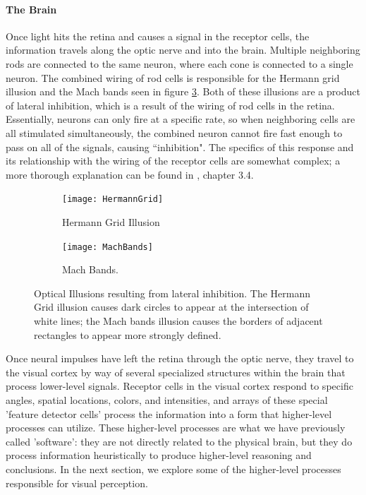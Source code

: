 \documentclass[11pt]{isuthesis}\usepackage[]{graphicx}\usepackage[]{color}
\begin{document}
\paragraph{The Brain}
Once light hits the retina and causes a signal in the receptor cells, the information travels along the optic nerve and into the brain. Multiple neighboring rods are connected to the same neuron, where each cone is connected to a single neuron. The combined wiring of rod cells is responsible for the Hermann grid illusion and the Mach bands seen in figure \ref{fig:InhibitionIllusions}. Both of these illusions are a product of lateral inhibition, which is a result of the wiring of rod cells in the retina. Essentially, neurons can only fire at a specific rate, so when neighboring cells are all stimulated simultaneously, the combined neuron cannot fire fast enough to pass on all of the signals, causing ``inhibition". The specifics of this response and its relationship with the wiring of the receptor cells are somewhat complex; a more thorough explanation can be found in \citet{goldstein}, chapter 3.4. 

\begin{figure}
\centering
\begin{subfigure}[b]{.45\linewidth}
  \centering
  \texttt{[image: HermannGrid]}
  \caption{\small Hermann Grid Illusion \label{fig:hermanngrid}}
\end{subfigure}\hfill
\begin{subfigure}[b]{.45\linewidth}
  \centering
  \texttt{[image: MachBands]}
  \caption{\small Mach Bands. 
  \label{fig:machbands}}
\end{subfigure}
\caption[Inhibition Illusions]{Optical Illusions resulting from lateral inhibition. The Hermann Grid illusion causes dark circles to appear at the intersection of white lines; the Mach bands illusion causes the borders of adjacent rectangles to appear more strongly defined.} \label{fig:InhibitionIllusions}
\end{figure}

Once neural impulses have left the retina through the optic nerve, they travel to the visual cortex by way of several specialized structures within the brain that process lower-level signals. Receptor cells in the visual cortex respond to specific angles, spatial locations, colors, and intensities, and arrays of these special 'feature detector cells' process the information into a form that higher-level processes can utilize. These higher-level processes are what we have previously called 'software': they are not directly related to the physical brain, but they do process information heuristically to produce higher-level reasoning and conclusions. In the next section, we explore some of the higher-level processes responsible for visual perception.
\end{document}
